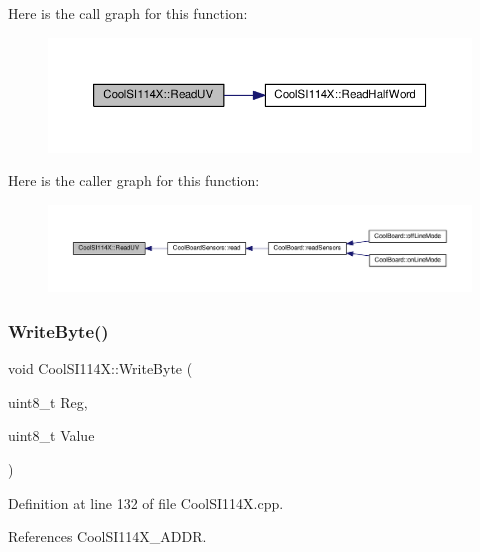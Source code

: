 Here is the call graph for this function\+:
\nopagebreak
\begin{figure}[H]
\begin{center}
\leavevmode
\includegraphics[width=350pt]{dd/d67/class_cool_s_i114_x_a14ced664d74e93438440b0274109c111_cgraph}
\end{center}
\end{figure}
Here is the caller graph for this function\+:
\nopagebreak
\begin{figure}[H]
\begin{center}
\leavevmode
\includegraphics[width=350pt]{dd/d67/class_cool_s_i114_x_a14ced664d74e93438440b0274109c111_icgraph}
\end{center}
\end{figure}
\mbox{\label{class_cool_s_i114_x_ac5c8dc5ade604da7a1c8cd1586feefc2}} 
\subsubsection{\texorpdfstring{Write\+Byte()}{WriteByte()}}
{\footnotesize\ttfamily void Cool\+S\+I114\+X\+::\+Write\+Byte (\begin{DoxyParamCaption}\item[{uint8\+\_\+t}]{Reg,  }\item[{uint8\+\_\+t}]{Value }\end{DoxyParamCaption})\hspace{0.3cm}{\ttfamily [private]}}



Definition at line 132 of file Cool\+S\+I114\+X.\+cpp.



References Cool\+S\+I114\+X\+\_\+\+A\+D\+DR.




